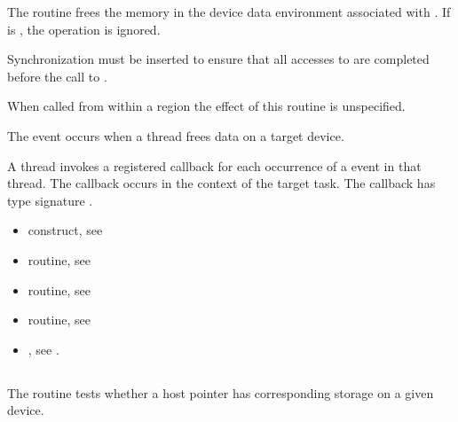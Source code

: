 \begin{ccppspecific}
The  routine frees the memory in the device data
environment associated with .  If  is
, the operation is ignored.

Synchronization must be inserted to ensure that all accesses to 
 are completed before the call to .

When called from within a  region the effect of this routine
is unspecified.

\events
The  event occurs when a thread frees data on a target device.

\tools

A thread invokes a registered 
callback for each occurrence of a  event in that thread. 
The callback occurs in the context of the target task.  The callback has type signature
. 


\crossreferences
\begin{itemize}
\item {} construct, see 

\item {} routine, see 

\item {} routine, see 

\item {} routine, see 

\item {}, see 
.

\end{itemize}



\pagebreak
{}
\subsection{}
\label{subsec:omp_target_is_present}
\summary

The  routine tests whether a host pointer
has corresponding storage on a given device.


\end{ccppspecific}
